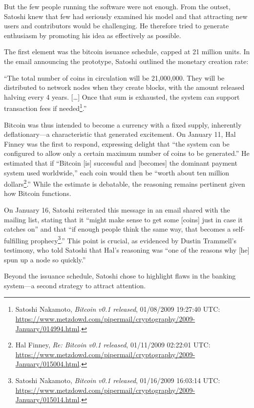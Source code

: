 \documentclass[
  a5paper,
  smalldemyvopaper,10pt,twoside,onecolumn,openright,extrafontsizes,hidelinks]{memoir}
\begin{document}
But the few people running the software were not enough. From the
outset, Satoshi knew that few had seriously examined his model and that
attracting new users and contributors would be challenging. He therefore
tried to generate enthusiasm by promoting his idea as effectively as
possible.

The first element was the bitcoin issuance schedule, capped at 21
million units. In the email announcing the prototype, Satoshi outlined
the monetary creation rate:

``The total number of coins in circulation will be 21,000,000. They will
be distributed to network nodes when they create blocks, with the amount
released halving every 4 years. {[}\ldots{]} Once that sum is exhausted,
the system can support transaction fees if needed\footnote{Satoshi
  Nakamoto, \emph{Bitcoin v0.1 released}, 01/08/2009 19:27:40 UTC:
  \url{https://www.metzdowd.com/pipermail/cryptography/2009-January/014994.html}.}.''

Bitcoin was thus intended to become a currency with a fixed supply,
inherently deflationary---a characteristic that generated excitement. On
January 11, Hal Finney was the first to respond, expressing delight that
``the system can be configured to allow only a certain maximum number of
coins to be generated.'' He estimated that if ``Bitcoin {[}is{]}
successful and {[}becomes{]} the dominant payment system used
worldwide,'' each coin would then be ``worth about ten million
dollars\footnote{Hal Finney, \emph{Re: Bitcoin v0.1 released},
  01/11/2009 02:22:01 UTC:
  \url{https://www.metzdowd.com/pipermail/cryptography/2009-January/015004.html}.}.''
While the estimate is debatable, the reasoning remains pertinent given
how Bitcoin functions.

On January 16, Satoshi reiterated this message in an email shared with
the mailing list, stating that it ``might make sense to get some
{[}coins{]} just in case it catches on'' and that ``if enough people
think the same way, that becomes a self-fulfilling
prophecy\footnote{Satoshi Nakamoto, \emph{Bitcoin v0.1 released},
  01/16/2009 16:03:14 UTC:
  \url{https://www.metzdowd.com/pipermail/cryptography/2009-January/015014.html}.}.''
This point is crucial, as evidenced by Dustin Trammell's testimony, who
told Satoshi that Hal's reasoning was ``one of the reasons why {[}he{]}
spun up a node so quickly.''

Beyond the issuance schedule, Satoshi chose to highlight flaws in the
banking system---a second strategy to attract attention.
\end{document}
